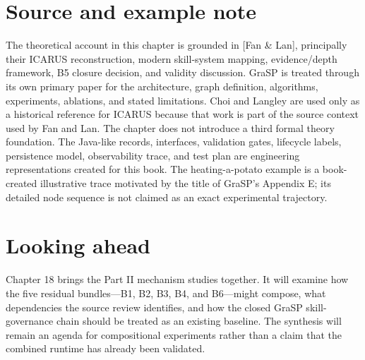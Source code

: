 \section*{Source and example note}

The theoretical account in this chapter is grounded in [Fan \& Lan], principally their ICARUS reconstruction, modern skill-system mapping, evidence/depth framework, B5 closure decision, and validity discussion. GraSP is treated through its own primary paper for the architecture, graph definition, algorithms, experiments, ablations, and stated limitations. Choi and Langley are used only as a historical reference for ICARUS because that work is part of the source context used by Fan and Lan. The chapter does not introduce a third formal theory foundation. The Java-like records, interfaces, validation gates, lifecycle labels, persistence model, observability trace, and test plan are engineering representations created for this book. The heating-a-potato example is a book-created illustrative trace motivated by the title of GraSP's Appendix E; its detailed node sequence is not claimed as an exact experimental trajectory.\autocite{xia2026grasp}

\section*{Looking ahead}

Chapter 18 brings the Part II mechanism studies together. It will examine how the five residual bundles—B1, B2, B3, B4, and B6—might compose, what dependencies the source review identifies, and how the closed GraSP skill-governance chain should be treated as an existing baseline. The synthesis will remain an agenda for compositional experiments rather than a claim that the combined runtime has already been validated.
